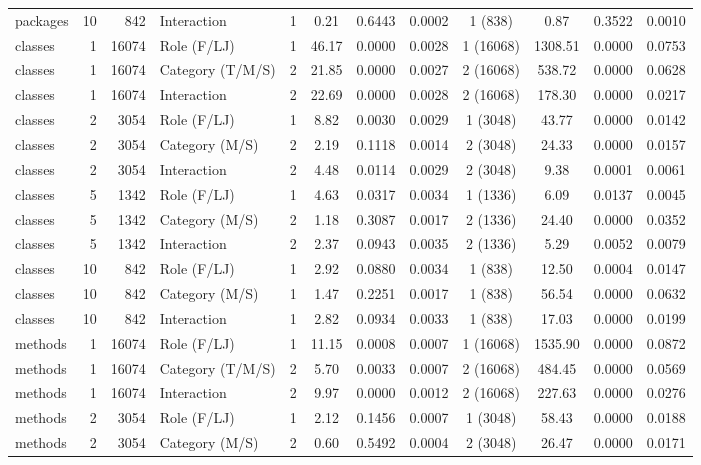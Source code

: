 \begin{landscape}
\begin{table}[H]
\begin{tabular}{l r r l ccc r ccc r}
packages & 10 & 842 & Interaction & 1 & 0.21 & 0.6443 & 0.0002 & 1 (838) & 0.87 & 0.3522 & 0.0010 \\ 
classes & 1 & 16074 & Role (F/LJ) & 1 & 46.17 & 0.0000 & 0.0028 & 1 (16068) & 1308.51 & 0.0000 & 0.0753 \\ 
classes & 1 & 16074 & Category (T/M/S) & 2 & 21.85 & 0.0000 & 0.0027 & 2 (16068) & 538.72 & 0.0000 & 0.0628 \\ 
classes & 1 & 16074 & Interaction & 2 & 22.69 & 0.0000 & 0.0028 & 2 (16068) & 178.30 & 0.0000 & 0.0217 \\ 
classes & 2 & 3054 & Role (F/LJ) & 1 & 8.82 & 0.0030 & 0.0029 & 1 (3048) & 43.77 & 0.0000 & 0.0142 \\ 
classes & 2 & 3054 & Category (M/S) & 2 & 2.19 & 0.1118 & 0.0014 & 2 (3048) & 24.33 & 0.0000 & 0.0157 \\ 
classes & 2 & 3054 & Interaction & 2 & 4.48 & 0.0114 & 0.0029 & 2 (3048) & 9.38 & 0.0001 & 0.0061 \\ 
classes & 5 & 1342 & Role (F/LJ) & 1 & 4.63 & 0.0317 & 0.0034 & 1 (1336) & 6.09 & 0.0137 & 0.0045 \\ 
classes & 5 & 1342 & Category (M/S) & 2 & 1.18 & 0.3087 & 0.0017 & 2 (1336) & 24.40 & 0.0000 & 0.0352 \\ 
classes & 5 & 1342 & Interaction & 2 & 2.37 & 0.0943 & 0.0035 & 2 (1336) & 5.29 & 0.0052 & 0.0079 \\ 
classes & 10 & 842 & Role (F/LJ) & 1 & 2.92 & 0.0880 & 0.0034 & 1 (838) & 12.50 & 0.0004 & 0.0147 \\ 
classes & 10 & 842 & Category (M/S) & 1 & 1.47 & 0.2251 & 0.0017 & 1 (838) & 56.54 & 0.0000 & 0.0632 \\ 
classes & 10 & 842 & Interaction & 1 & 2.82 & 0.0934 & 0.0033 & 1 (838) & 17.03 & 0.0000 & 0.0199 \\ 
methods & 1 & 16074 & Role (F/LJ) & 1 & 11.15 & 0.0008 & 0.0007 & 1 (16068) & 1535.90 & 0.0000 & 0.0872 \\ 
methods & 1 & 16074 & Category (T/M/S) & 2 & 5.70 & 0.0033 & 0.0007 & 2 (16068) & 484.45 & 0.0000 & 0.0569 \\ 
methods & 1 & 16074 & Interaction & 2 & 9.97 & 0.0000 & 0.0012 & 2 (16068) & 227.63 & 0.0000 & 0.0276 \\ 
methods & 2 & 3054 & Role (F/LJ) & 1 & 2.12 & 0.1456 & 0.0007 & 1 (3048) & 58.43 & 0.0000 & 0.0188 \\ 
methods & 2 & 3054 & Category (M/S) & 2 & 0.60 & 0.5492 & 0.0004 & 2 (3048) & 26.47 & 0.0000 & 0.0171 \\ 

\end{tabular}
\end{table}
\end{landscape}
